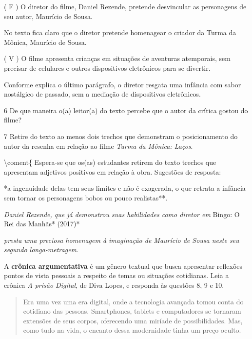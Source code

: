 {{( F ) O diretor do filme, Daniel Rezende, pretende desvincular as
personagens de seu autor, Maurício de Sousa.

No texto fica claro que o diretor pretende homenagear o criador da Turma
da Mônica, Maurício de Sousa.

( V ) O filme apresenta crianças em situações de aventuras atemporais,
sem precisar de celulares e outros dispositivos eletrônicos para se
divertir. 

Conforme explica o último parágrafo, o diretor resgata uma infância com
sabor nostálgico de passado, sem a mediação de dispositivos eletrônicos.}

\num{6} De que maneira o(a) leitor(a) do texto percebe que o autor da
crítica gostou do filme?


\num{7} Retire do texto ao menos dois trechos que demonstram o
posicionamento do autor da resenha em relação ao filme \emph{Turma da
Mônica: Laços}.

\textbackslash coment\{ Espera-se que os(as) estudantes retirem do texto
trechos que apresentam adjetivos positivos em relação à obra. Sugestões
de resposta:

*a ingenuidade delas tem seus limites e não é exagerada, o que retrata a
infância sem tornar os personagens bobos ou pouco realistas**.

\emph{Daniel Rezende, que já demonstrou suas habilidades como diretor em
}Bingo: O Rei das Manhãs* (2017)*

\emph{presta uma preciosa homenagem à imaginação de Maurício de Sousa
neste seu segundo longa-metragem.}

A \textbf{crônica argumentativa} é um gênero textual que busca
apresentar reflexões pontos de vista pessoais a respeito de temas ou
situações cotidianas. Leia a crônica \emph{A prisão Digital}, de Diva
Lopes, e responda às questões 8, 9 e 10.

\begin{quote}
Era uma vez uma era digital, onde a tecnologia avançada tomou conta do
cotidiano das pessoas. Smartphones, tablets e computadores se tornaram
extensões de seus corpos, oferecendo uma miríade de possibilidades. Mas,
como tudo na vida, o encanto dessa modernidade tinha um preço oculto.
\end{quote}

}
